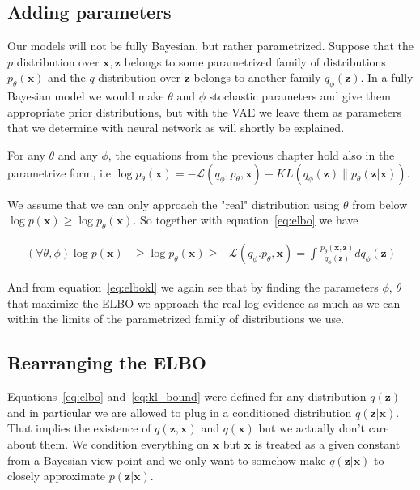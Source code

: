 \documentclass[11pt, a4paper]{report}
\theoremstyle{plain}
\theoremstyle{definition}
\theoremstyle{remark}
\newcommand{\x}{\mathbf{x}}
\newcommand{\z}{\mathbf{z}}
\begin{document}
\subsection{Adding parameters}

Our models will not be fully Bayesian, but rather parametrized.
Suppose that the $p$ distribution over $\x,\z$ belongs to some parametrized family of
distributions $p_{\theta}(\x)$ and the $q$ distribution over $\z$ belongs to another
family $q_{\phi}(\z)$. In a fully Bayesian model we would make $\theta$ and
$\phi$ stochastic parameters and give them appropriate prior distributions, but
with the VAE we leave them as parameters that we determine with neural network
as will shortly be explained.

For any $\theta$ and any $\phi$, the equations from the previous chapter hold
also in the parametrize form, i.e 
$\log p_{\theta}(\x) =
-\mathcal{L}(q_{\phi},p_{\theta},\x) -
KL(q_{\phi}(\z) \| p_{\theta}(\z|\x))$.

We assume that we can only approach the "real" distribution using
$\theta$ from below $\log p(\x) \geq \log p_{\theta}(\x)$.
So together with equation~\ref{eq:elbo} we have

\begin{equation}\label{eq:parelbo}
\begin{aligned}
(\forall \theta, \phi)\log p(\x) & \geq \log p_{\theta}(\x) 
\geq -\mathcal{L}(q_{\phi}.p_{\theta},\x)
= \int \frac{p_{\theta}(\x,\z)}{q_{\phi}(\z)} dq_{\phi}(\z)
\end{aligned}
\end{equation}

And from equation~\ref{eq:elbokl} we again see that by finding the parameters
$\phi$, $\theta$ that maximize the ELBO we approach the real log evidence as much
as we can within the limits of the parametrized family of distributions we use.

\subsection{Rearranging the ELBO}
Equations~\ref{eq:elbo} and~\ref{eq:kl_bound} were defined for any distribution
$q(\z)$ and in particular we are allowed to plug in a conditioned
distribution $q(\z|\x)$. That implies the existence of $q(\z,\x)$ and $q(\x)$
but we actually don't care about them. We condition everything on $\x$ but $\x$
is treated as a given constant from a Bayesian view point and we only want to
somehow make $q(\z|\x)$ to closely approximate $p(\z | \x)$.
\end{document}
